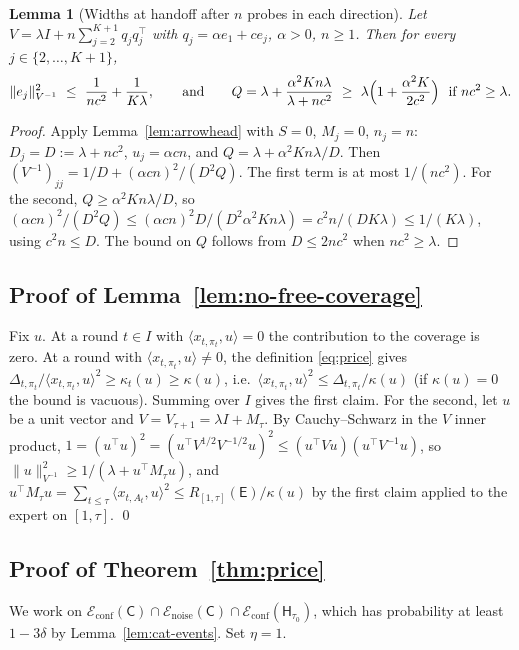 \documentclass{article}
\newtheorem{lemma}{Lemma}
\theoremstyle{definition}
\theoremstyle{remark}
\theoremstyle{remark}
\newcommand{\Cold}{\mathsf{C}}
\newcommand{\Exp}{\mathsf{E}}
\newcommand{\Hyb}{\mathsf{H}}
\begin{document}
\begin{lemma}[Widths at handoff after $n$ probes in each direction]
\label{lem:cat-handoff}
Let $V=\lambda I+n\sum_{j=2}^{K+1}q_jq_j^\top$ with $q_j=\alpha e_1+ce_j$, $\alpha>0$,
$n\ge1$. Then for every $j\in\{2,\dots,K+1\}$,
\[
\|e_j\|^2_{V^{-1}}\ \le\ \frac1{nc^2}+\frac1{K\lambda},
\qquad\text{and}\qquad
Q=\lambda+\frac{\alpha^2Kn\lambda}{\lambda+nc^2}\ \ge\ \lambda\Bigl(1+\frac{\alpha^2K}{2c^2}\Bigr)\ \text{ if } nc^2\ge\lambda .
\]
\end{lemma}

\begin{proof}
Apply Lemma~\ref{lem:arrowhead} with $S=0$, $M_j=0$, $n_j=n$: $D_j=D:=\lambda+nc^2$,
$u_j=\alpha cn$, and $Q=\lambda+\alpha^2Kn\lambda/D$. Then
$(V^{-1})_{jj}=1/D+(\alpha cn)^2/(D^2Q)$. The first term is at most $1/(nc^2)$.
For the second, $Q\ge\alpha^2Kn\lambda/D$, so
$(\alpha cn)^2/(D^2Q)\le(\alpha cn)^2D/(D^2\alpha^2Kn\lambda)=c^2n/(DK\lambda)\le1/(K\lambda)$,
using $c^2n\le D$. The bound on $Q$ follows from $D\le2nc^2$ when $nc^2\ge\lambda$.
\end{proof}

\subsection{Proof of Lemma~\ref{lem:no-free-coverage}}

Fix $u$. At a round $t\in I$ with $\langle x_{t,\pi_t},u\rangle=0$ the
contribution to the coverage is zero. At a round with
$\langle x_{t,\pi_t},u\rangle\ne0$, the definition \eqref{eq:price} gives
$\Delta_{t,\pi_t}/\langle x_{t,\pi_t},u\rangle^2\ge\kappa_t(u)\ge\kappa(u)$, i.e.\
$\langle x_{t,\pi_t},u\rangle^2\le\Delta_{t,\pi_t}/\kappa(u)$ (if $\kappa(u)=0$ the bound
is vacuous). Summing over $I$ gives the first claim. For the second, let
$u$ be a unit vector and $V=V_{\tau+1}=\lambda I+M_\tau$. By Cauchy--Schwarz in
the $V$ inner product,
$1=(u^\top u)^2=(u^\top V^{1/2}V^{-1/2}u)^2\le(u^\top Vu)(u^\top V^{-1}u)$, so
$\|u\|^2_{V^{-1}}\ge1/(\lambda+u^\top M_\tau u)$, and
$u^\top M_\tau u=\sum_{t\le\tau}\langle x_{t,A_t},u\rangle^2\le R_{[1,\tau]}(\Exp)/\kappa(u)$
by the first claim applied to the expert on $[1,\tau]$. \qed

\subsection{Proof of Theorem~\ref{thm:price}}

We work on $\mathcal E_{\mathrm{conf}}(\Cold)\cap\mathcal E_{\mathrm{noise}}(\Cold)\cap\mathcal E_{\mathrm{conf}}(\Hyb_{\tau_0})$,
which has probability at least $1-3\delta$ by Lemma~\ref{lem:cat-events}. Set
$\eta=1$.
\end{document}
